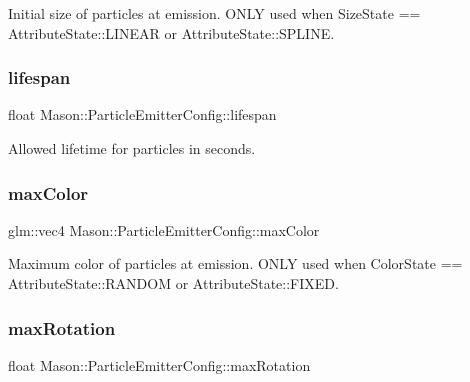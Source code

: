Initial size of particles at emission. O\+N\+LY used when Size\+State == Attribute\+State\+::\+L\+I\+N\+E\+AR or Attribute\+State\+::\+S\+P\+L\+I\+NE. 

\hypertarget{struct_mason_1_1_particle_emitter_config_a856b3906e25a7d41eb9bc7e37a91ef93}{}\label{struct_mason_1_1_particle_emitter_config_a856b3906e25a7d41eb9bc7e37a91ef93} 
\subsubsection{\texorpdfstring{lifespan}{lifespan}}
{\footnotesize\ttfamily float Mason\+::\+Particle\+Emitter\+Config\+::lifespan}



Allowed lifetime for particles in seconds. 

\hypertarget{struct_mason_1_1_particle_emitter_config_af48c8574b50e51408c3566f862e22dbd}{}\label{struct_mason_1_1_particle_emitter_config_af48c8574b50e51408c3566f862e22dbd} 
\subsubsection{\texorpdfstring{max\+Color}{maxColor}}
{\footnotesize\ttfamily glm\+::vec4 Mason\+::\+Particle\+Emitter\+Config\+::max\+Color}



Maximum color of particles at emission. O\+N\+LY used when Color\+State == Attribute\+State\+::\+R\+A\+N\+D\+OM or Attribute\+State\+::\+F\+I\+X\+ED. 

\hypertarget{struct_mason_1_1_particle_emitter_config_a3a7e271bae699c0998a3d9ac73f3bb6f}{}\label{struct_mason_1_1_particle_emitter_config_a3a7e271bae699c0998a3d9ac73f3bb6f} 
\subsubsection{\texorpdfstring{max\+Rotation}{maxRotation}}
{\footnotesize\ttfamily float Mason\+::\+Particle\+Emitter\+Config\+::max\+Rotation}



